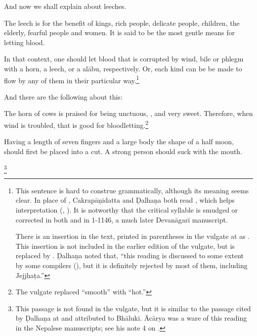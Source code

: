 \begin{translation}    
\item [1] 
    And now we shall explain  about leeches.
    
\item [3] The leech is for the benefit of kings, rich people, delicate people,
children, the elderly, fearful people and women.  It is said to be the most
gentle means for letting blood.

\item [4]

In that context, one should let blood that is corrupted by wind, bile or
phlegm with a horn, a leech, or a \gls{alābu}, respectively.   Or, each kind
can be be made to flow by any of them in their particular way.\footnote{This
    sentence is hard to construe grammatically, although its meaning seems
    clear. In place of , Cakrapāṇidatta and Ḍalhaṇa both read
    , which helps interpretation (\cite[95]{acar-1939},
    \cite[55]{vulgate}). It is notworthy that the critical syllable  is
    smudged or corrected in both  and in 1-1146, a
    much later Devanāgarī manuscript.
      
There is an insertion in the text, printed in parentheses in the
vulgate at  as  .  This insertion is not included in the
earlier edition of the vulgate, but is replaced by
 \citep[54]{susr-trikamji2}. Ḍalhaṇa noted that,
“this reading is discussed to some extent by some compilers
(), but it is definitely rejected by most of them,
including Jejjhaṭa.” }

\item[1.13.5x]  And there are the following about this:

\item [1.13.5]

The horn of cows is praised for being unctuous, , and very
sweet.  Therefore, when wind is troubled, that is good for
bloodletting.\footnote{The vulgate replaced “smooth” with “hot.”}

\item [1.13.5a]

Having a length of seven fingers and a large body the shape of a half moon, should 
first be placed into a cut.  A strong person should suck with the mouth. 

\footnote{This passage is not found in the vulgate, but it is similar to the passage 
cited by Ḍalhaṇa at  and attributed to Bhāluki.  Ācārya was a ware of 
this reading in the Nepalese manuscripts; see his note 4 on .}


\end{translation}
